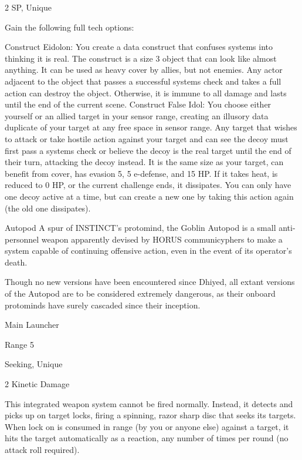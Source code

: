 2 SP, Unique

Gain the following full tech options:

        Construct Eidolon: You create a data construct that confuses systems into thinking it is
         real. The construct is a size 3 object that can look like almost anything. It can be used as
         heavy cover by allies, but not enemies. Any actor adjacent to the object that passes a
        successful systems check and takes a full action can destroy the object. Otherwise, it is
         immune to all damage and lasts until the end of the current scene.
        Construct False Idol: You choose either yourself or an allied target in your sensor range,
        creating an illusory data duplicate of your target at any free space in sensor range. Any
        target that wishes to attack or take hostile action against your target and can see the
        decoy must first pass a systems check or believe the decoy is the real target until the end
        of their turn, attacking the decoy instead. It is the same size as your target, can benefit
        from cover, has evasion 5, 5 e-defense, and 15 HP. If it takes heat, is reduced to 0 HP, or
        the current challenge ends, it dissipates. You can only have one decoy active at a time,
         but can create a new one by taking this action again (the old one dissipates).


Autopod
A spur of INSTINCT’s protomind, the Goblin Autopod is a small anti-personnel weapon apparently
devised by HORUS communicyphers to make a system capable of continuing offensive action,
even in the event of its operator’s death.

Though no new versions have been encountered since Dhiyed, all extant versions of the Autopod
are to be considered extremely dangerous, as their onboard protominds have surely cascaded
since their inception.

Main Launcher





Range 5

Seeking, Unique

2 Kinetic Damage

This integrated weapon system cannot be fired normally. Instead, it detects and picks up on
target locks, firing a spinning, razor sharp disc that seeks its targets. When lock on is consumed
in range (by you or anyone else) against a target, it hits the target automatically as a reaction, any
number of times per round (no attack roll required).

